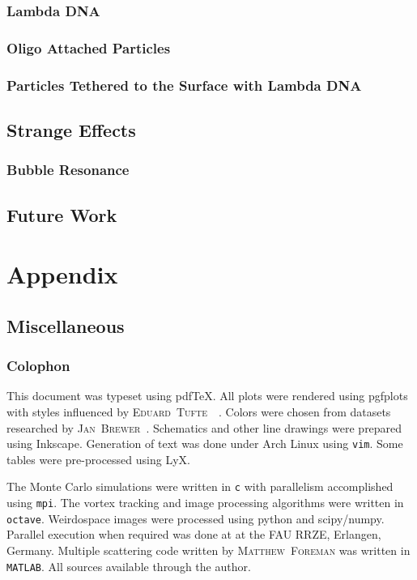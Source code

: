 \documentclass[a4paper,titlepage,onecolumn]{report}
\newcommand{\name}[1]{\textsc{#1}}
\begin{document}
\section{Lambda DNA}
\section{Oligo Attached Particles}
\section{Particles Tethered to the Surface with Lambda DNA}

\chapter{Strange Effects}
\section{Bubble Resonance}

\chapter{Future Work}

\part{Appendix}
\appendix

\chapter{Miscellaneous}
\section{Colophon}
This document was typeset using pdf\TeX. All
plots were rendered using pgfplots~\cite{feuersangerpgfplots} with styles influenced by
\name{Eduard~Tufte}~\cite{tufte1983visual}~\cite{tufte1991envisioning}. Colors were chosen
from datasets researched by \name{Jan~Brewer}~\cite{harrower2003colorbrewer}.
Schematics and other line drawings were prepared using Inkscape. Generation
of text was done under Arch Linux using \texttt{vim}.  Some tables were
pre-processed using LyX.

The Monte Carlo simulations were written in \texttt{c} with parallelism
accomplished using \texttt{mpi}. The vortex tracking and image processing
algorithms were written in \texttt{octave}.  Weirdospace images were
processed using python and scipy/numpy.  Parallel execution when required
was done at at the FAU RRZE, Erlangen, Germany.  Multiple scattering code
written by \name{Matthew~Foreman} was written in \texttt{MATLAB}.  All sources
available through the author.
\end{document}
